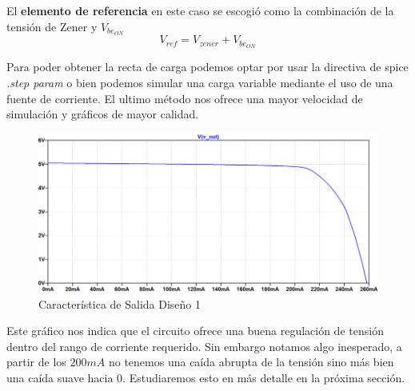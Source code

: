 El \textbf{elemento de referencia} en este caso se escogió como la combinación de la tensión de Zener y $V_{be_{ON}}$
\begin{equation}
	V_{ref} = V_{zener} + V_{be_{ON}}
\end{equation}

Para poder obtener la recta de carga podemos optar por usar la directiva de spice \textit{.step param} o bien podemos simular una carga variable mediante el uso de una fuente de corriente. El ultimo método nos ofrece una mayor velocidad de simulación y gráficos de mayor calidad.

\begin{figure}[H]
	\centering
	\includegraphics[width=0.7\linewidth]{ImagenesEjercicio1/CaracteristicaDeSalidaConGrillaFV}
	\caption{Característica de Salida Diseño 1}
	\label{fig:caracteristicadesalidacongrillafv}
\end{figure}

Este gráfico nos indica que el circuito ofrece una buena regulación de tensión dentro del rango de corriente requerido. Sin embargo notamos algo inesperado, a partir de los $200mA$ no tenemos una caída abrupta de la tensión sino más bien una caída suave hacia 0. Estudiaremos esto en más detalle en la próxima sección.

